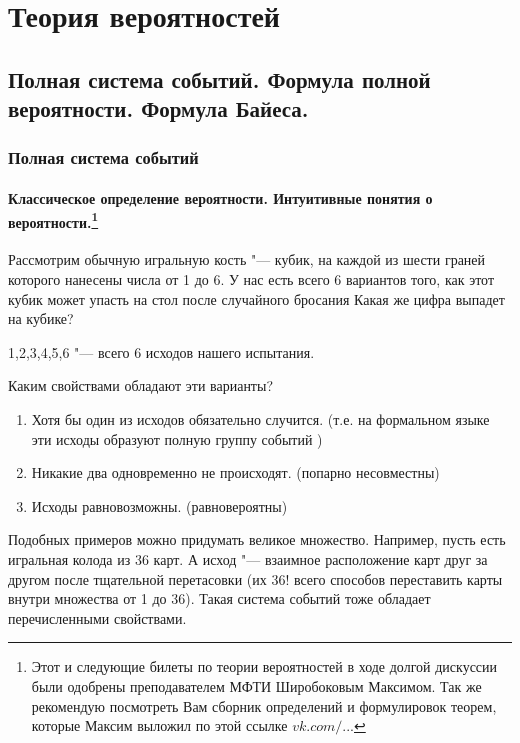 \part[Теория вероятностей]{Теория вероятностей}%

\chapter{Полная система событий. Формула полной вероятности. Формула Байеса.}
\section{Полная система событий}

\subsection[Классическое определение вероятности. Интуитивные понятия о вероятности.]{Классическое определение вероятности. Интуитивные понятия о вероятности.\protect\footnote{Этот и следующие билеты по теории вероятностей в ходе долгой дискуссии были одобрены преподавателем МФТИ Широбоковым Максимом. Так же рекомендую посмотреть Вам сборник определений и формулировок теорем, которые Максим выложил по этой ссылке \href{https://vk.com/shmaxg?w=wall5284431_903}{$vk.com/...$}}}

Рассмотрим обычную игральную кость "--- кубик, на каждой из шести граней которого нанесены числа от 1 до 6. У нас есть всего 6 вариантов того, как этот кубик может упасть на стол после случайного бросания Какая же цифра выпадет на кубике? 
\begin{center}
1,2,3,4,5,6 "--- всего 6 исходов нашего испытания.
\end{center}
Каким свойствами обладают эти варианты?
\begin{enumerate}
\item Хотя бы один из исходов обязательно случится. (т.е. на формальном языке эти исходы образуют полную группу событий )
\item Никакие два одновременно не происходят. (попарно несовместны)
\item Исходы равновозможны. (равновероятны)
\end{enumerate}

Подобных примеров можно придумать великое множество. Например, пусть есть игральная колода из 36 карт. А исход "--- взаимное расположение карт друг за другом после тщательной перетасовки (их 36! всего способов переставить карты внутри множества от 1 до 36). Такая система событий тоже обладает перечисленными свойствами.

